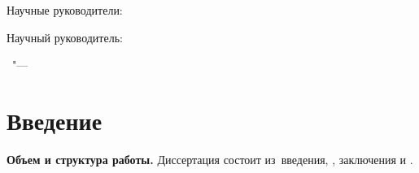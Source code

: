 \documentclass{article}
\begin{document}
%
\vspace{0pt plus4fill} %
\begin{flushright}
\ifdefined\supervisorTwoFio
Научные руководители:

\supervisorRegalia

\ifdefined\supervisorDead
\framebox{\supervisorFio}
\else
\supervisorFio
\fi

\supervisorTwoRegalia

\ifdefined\supervisorTwoDead
\framebox{\supervisorTwoFio}
\else
\supervisorTwoFio
\fi
\else
Научный руководитель:

\supervisorRegalia

\ifdefined\supervisorDead
\framebox{\supervisorFio}
\else
\supervisorFio
\fi
\fi

\end{flushright}
%
\vspace{0pt plus4fill} %
{\centering\thesisCity\ "--- \thesisYear\par}



\chapter*{Введение}                         %

\newcommand{\actuality}{{\textbf\actualityTXT}}
\newcommand{\progress}{{\textbf\progressTXT}}
\newcommand{\aim}{{\textbf\aimTXT}}
\newcommand{\tasks}{\textbf{\tasksTXT}}
\newcommand{\novelty}{\textbf{\noveltyTXT}}
\newcommand{\influence}{\textbf{\influenceTXT}}
\newcommand{\methods}{\textbf{\methodsTXT}}
\newcommand{\defpositions}{\textbf{\defpositionsTXT}}
\newcommand{\reliability}{\textbf{\reliabilityTXT}}
\newcommand{\probation}{\textbf{\probationTXT}}
\newcommand{\contribution}{\textbf{\contributionTXT}}
\newcommand{\publications}{\textbf{\publicationsTXT}}


\textbf{Объем и структура работы.} Диссертация состоит из~введения,
,
заключения и
.
%
\end{document}
